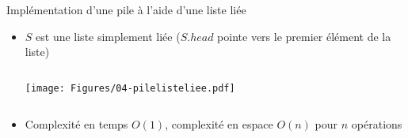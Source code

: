 





\begin{frame}{Implémentation d'une pile à l'aide d'une liste liée}

\begin{itemize}
\item $S$ est une liste simplement liée ($S.head$ pointe vers le premier élément de la liste)

\medskip

\begin{columns}
\begin{column}{5cm}
\begin{center}
\texttt{[image: Figures/04-pilelisteliee.pdf]}
\end{center}

\bigskip

\end{column}
\begin{column}{5cm}
\begin{center}
  \footnotesize
  \hfill

\bigskip  

    \end{center}
\end{column}
\end{columns}

\item Complexité en temps $O(1)$, complexité en espace $O(n)$ pour $n$ opérations
\end{itemize}

\end{frame}

